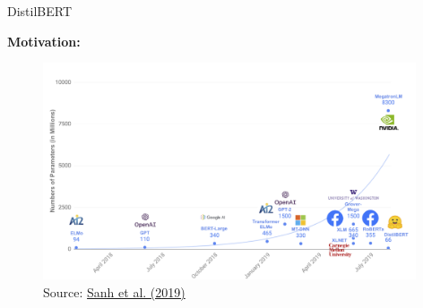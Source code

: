 
\begin{frame}{DistilBERT \href{https://arxiv.org/pdf/1910.01108.pdf}{}}

\textbf{Motivation:}
	\begin{figure}
		\centering
		\includegraphics[width = 11cm]{figure/distilbert-motivation}\\ 
		{\footnotesize Source: \href{https://arxiv.org/pdf/1910.01108.pdf}{Sanh et al. (2019)}}
	\end{figure}
	
\end{frame}



